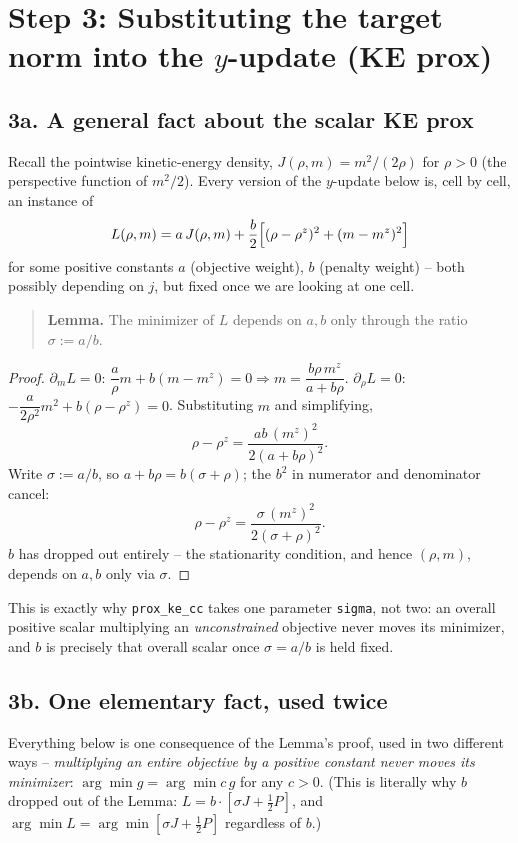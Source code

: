 \documentclass[11pt]{article}
\newcommand{\code}[1]{\texttt{#1}}
\begin{document}
\section*{Step 3: Substituting the target norm into the $y$-update (KE prox)}

\subsection*{3a. A general fact about the scalar KE prox}

Recall the pointwise kinetic-energy density, $J(\rho,m)=m^2/(2\rho)$ for $\rho>0$ (the perspective
function of $m^2/2$). Every version of the $y$-update below is, cell by cell, an instance of
\[
  L(\rho,m) = a\,J(\rho,m) + \frac{b}{2}\Bigl[(\rho-\rho^z)^2+(m-m^z)^2\Bigr]
\]
for some positive constants $a$ (objective weight), $b$ (penalty weight) -- both possibly
depending on $j$, but fixed once we are looking at one cell.

\begin{quote}
\textbf{Lemma.} The minimizer of $L$ depends on $a,b$ only through the ratio $\sigma:=a/b$.
\end{quote}
\begin{proof}
$\partial_m L=0$: $\dfrac{a}{\rho}m+b(m-m^z)=0 \Rightarrow m = \dfrac{b\rho\,m^z}{a+b\rho}$.
$\partial_\rho L=0$: $-\dfrac{a}{2\rho^2}m^2+b(\rho-\rho^z)=0$. Substituting $m$ and simplifying,
\[
  \rho-\rho^z = \frac{ab\,(m^z)^2}{2(a+b\rho)^2}.
\]
Write $\sigma:=a/b$, so $a+b\rho=b(\sigma+\rho)$; the $b^2$ in numerator and denominator cancel:
\[
  \rho-\rho^z = \frac{\sigma\,(m^z)^2}{2(\sigma+\rho)^2}.
\]
$b$ has dropped out entirely -- the stationarity condition, and hence $(\rho,m)$, depends on $a,b$
only via $\sigma$. \qedhere
\end{proof}

This is exactly why \code{prox\_ke\_cc} takes one parameter \code{sigma}, not two: an overall
positive scalar multiplying an \emph{unconstrained} objective never moves its minimizer, and $b$ is
precisely that overall scalar once $\sigma=a/b$ is held fixed.

\subsection*{3b. One elementary fact, used twice}

Everything below is one consequence of the Lemma's proof, used in two different ways --
\emph{multiplying an entire objective by a positive constant never moves its minimizer}:
$\arg\min g = \arg\min c\,g$ for any $c>0$. (This is literally why $b$ dropped out of the Lemma:
$L=b\cdot[\sigma J+\tfrac12 P]$, and $\arg\min L=\arg\min[\sigma J+\tfrac12 P]$ regardless of $b$.)
\end{document}
